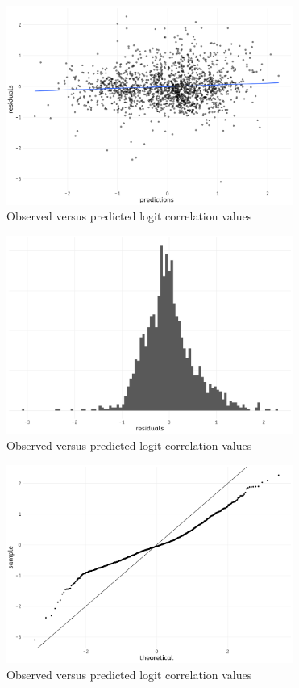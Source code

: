 \documentclass[a4paper,fleqn,usenatbib]{mnras}
\begin{document}
\begin{figure}
  \includegraphics[width=\columnwidth, height = 6.5cm]{figures/residuals-predicted}
    \caption{Observed versus predicted logit correlation values}
    \label{fig:residuals-pred}
\end{figure}

\begin{figure}
  \includegraphics[width=\columnwidth, height = 6.5cm]{figures/residuals-hist}
    \caption{Observed versus predicted logit correlation values}
    \label{fig:residuals-hist}
\end{figure}

\begin{figure}
  \includegraphics[width=\columnwidth, height = 6.5cm]{figures/residuals-qq}
    \caption{Observed versus predicted logit correlation values}
    \label{fig:residuals-qq}
\end{figure}
\end{document}
